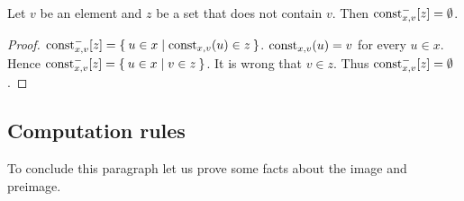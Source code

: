 \documentclass[../../set-theory.tex]{subfiles}
\begin{document}
\begin{forthel}
    \begin{proposition}\label{SetTheory_02_02_483725}
      Let $v$ be an element and $z$ be a set that does not contain $v$.
      Then $\mbox{const}_{x,v}^{-}[z] = \emptyset$.
    \end{proposition}
    \begin{proof}
      $\mbox{const}_{x,v}^{-}[z] = \Set{u \in x | \mbox{const}_{x,v}(u) \in z}$.
      $\mbox{const}_{x,v}(u) = v$ for every $u \in x$.
      Hence $\mbox{const}_{x,v}^{-}[z] = \Set{u \in x | v \in z}$.
      It is wrong that $v \in z$.
      Thus $\mbox{const}_{x,v}^{-}[z] = \emptyset$.
    \end{proof}
  \end{forthel}


  \subsection{Computation rules}

  To conclude this paragraph let us prove some facts about the image and
  preimage.
\end{document}

